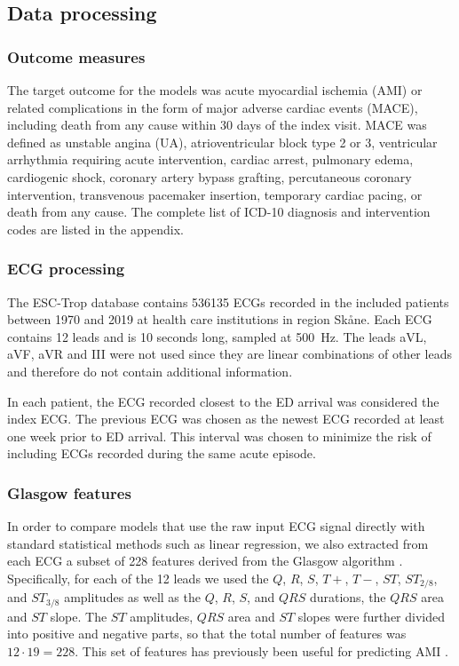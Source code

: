 \documentclass[preprint]{elsarticle}
\begin{document}
\subsection{Data processing}
\subsubsection{Outcome measures}
The target outcome for the models was acute myocardial ischemia (AMI) or related complications in the form of major adverse cardiac events (MACE), including death from any cause within 30 days of the index visit. MACE was defined as unstable angina (UA), atrioventricular block type 2 or 3, ventricular arrhythmia requiring acute intervention, cardiac arrest, pulmonary edema, cardiogenic shock, coronary artery bypass grafting, percutaneous coronary intervention, transvenous pacemaker insertion, temporary cardiac pacing, or death from any cause. The complete list of ICD-10 diagnosis and intervention codes are listed in the appendix.

\subsubsection{ECG processing}
The ESC-Trop database contains 536135 ECGs recorded in the included patients between 1970 and 2019 at health care institutions in region Sk\aa{}ne. Each ECG contains 12 leads and is 10 seconds long, sampled at \qty{500}{\hertz}. The leads aVL, aVF, aVR and III were not used since they are linear combinations of other leads and therefore do not contain additional information.

In each patient, the ECG recorded closest to the ED arrival was considered the index ECG. The previous ECG was chosen as the newest ECG recorded at least one week prior to ED arrival. This interval was chosen to minimize the risk of including ECGs recorded during the same acute episode.
\subsubsection{Glasgow features}
In order to compare models that use the raw input ECG signal directly with standard statistical methods such as linear regression, we also extracted from each ECG a subset of 228 features derived from the Glasgow algorithm \citep{macfarlane2005}. Specifically, for each of the 12 leads we used the $Q$, $R$, $S$, $T+$, $T-$, $ST$, $ST_{2/8}$, and $ST_{3/8}$ amplitudes as well as the $Q$, $R$, $S$, and $QRS$ durations, the $QRS$ area and $ST$ slope. The $ST$ amplitudes, $QRS$ area and $ST$ slopes were further divided into positive and negative parts, so that the total number of features was $12 \cdot 19=228$. This set of features has previously been useful for predicting AMI \citep{forberg2009}.
\end{document}
